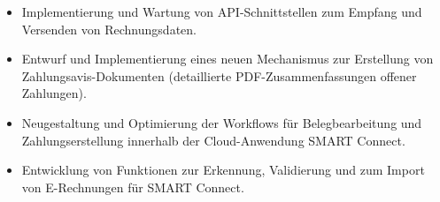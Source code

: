 \begin{minipage}{\linewidth}
\begin{itemize}
  \item Implementierung und Wartung von API-Schnittstellen zum Empfang und Versenden von Rechnungsdaten.
  \item Entwurf und Implementierung eines neuen Mechanismus zur Erstellung von Zahlungsavis-Dokumenten (detaillierte PDF-Zusammenfassungen offener Zahlungen).
  \item Neugestaltung und Optimierung der Workflows für Belegbearbeitung und Zahlungserstellung innerhalb der Cloud-Anwendung SMART Connect.
  \item Entwicklung von Funktionen zur Erkennung, Validierung und zum Import von E-Rechnungen für SMART Connect.
\end{itemize}
\end{minipage}
\divider